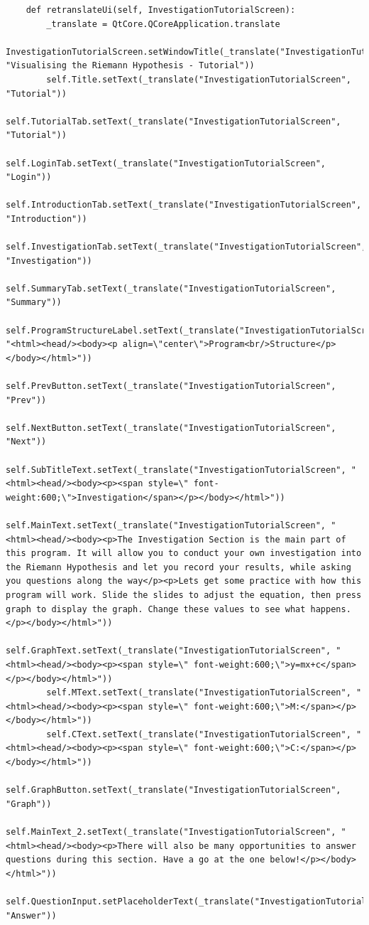 \documentclass{article}
\begin{document}
\begin{lstlisting}
    def retranslateUi(self, InvestigationTutorialScreen):
        _translate = QtCore.QCoreApplication.translate
        InvestigationTutorialScreen.setWindowTitle(_translate("InvestigationTutorialScreen", "Visualising the Riemann Hypothesis - Tutorial"))
        self.Title.setText(_translate("InvestigationTutorialScreen", "Tutorial"))
        self.TutorialTab.setText(_translate("InvestigationTutorialScreen", "Tutorial"))
        self.LoginTab.setText(_translate("InvestigationTutorialScreen", "Login"))
        self.IntroductionTab.setText(_translate("InvestigationTutorialScreen", "Introduction"))
        self.InvestigationTab.setText(_translate("InvestigationTutorialScreen", "Investigation"))
        self.SummaryTab.setText(_translate("InvestigationTutorialScreen", "Summary"))
        self.ProgramStructureLabel.setText(_translate("InvestigationTutorialScreen", "<html><head/><body><p align=\"center\">Program<br/>Structure</p></body></html>"))
        self.PrevButton.setText(_translate("InvestigationTutorialScreen", "Prev"))
        self.NextButton.setText(_translate("InvestigationTutorialScreen", "Next"))
        self.SubTitleText.setText(_translate("InvestigationTutorialScreen", "<html><head/><body><p><span style=\" font-weight:600;\">Investigation</span></p></body></html>"))
        self.MainText.setText(_translate("InvestigationTutorialScreen", "<html><head/><body><p>The Investigation Section is the main part of this program. It will allow you to conduct your own investigation into the Riemann Hypothesis and let you record your results, while asking you questions along the way</p><p>Lets get some practice with how this program will work. Slide the slides to adjust the equation, then press graph to display the graph. Change these values to see what happens.</p></body></html>"))
        self.GraphText.setText(_translate("InvestigationTutorialScreen", "<html><head/><body><p><span style=\" font-weight:600;\">y=mx+c</span></p></body></html>"))
        self.MText.setText(_translate("InvestigationTutorialScreen", "<html><head/><body><p><span style=\" font-weight:600;\">M:</span></p></body></html>"))
        self.CText.setText(_translate("InvestigationTutorialScreen", "<html><head/><body><p><span style=\" font-weight:600;\">C:</span></p></body></html>"))
        self.GraphButton.setText(_translate("InvestigationTutorialScreen", "Graph"))
        self.MainText_2.setText(_translate("InvestigationTutorialScreen", "<html><head/><body><p>There will also be many opportunities to answer questions during this section. Have a go at the one below!</p></body></html>"))
        self.QuestionInput.setPlaceholderText(_translate("InvestigationTutorialScreen", "Answer"))

\end{lstlisting}
\end{document}
